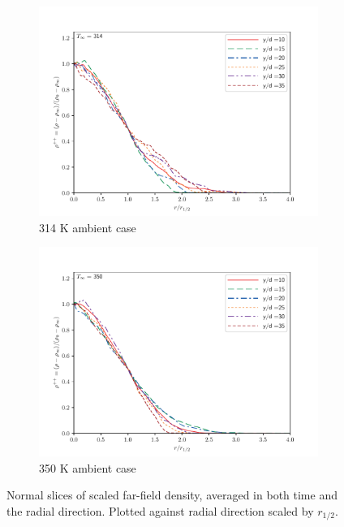 \begin{figure}[H]
\begin{center}
\begin{subfigure}{0.45\textwidth}
	\includegraphics[scale=.45]{figures/Plots/radial/slices_5/314_ambient/r_vs_rho.pdf}
	\caption{314 K ambient case} \label{noniso_r_vs_rho_1}
\end{subfigure}
\begin{subfigure}{0.45\textwidth}
	\includegraphics[scale=.45]{figures/Plots/radial/slices_5/350_ambient/r_vs_rho.pdf}
	\caption{350 K ambient case} \label{noniso_r_vs_rho_2}
\end{subfigure}
\caption{Normal slices of scaled far-field density, averaged in both time and the radial direction. Plotted against radial direction scaled by $r_{1/2}$.}
\label{noniso_far_r_rho_features}
\end{center}
\end{figure}
